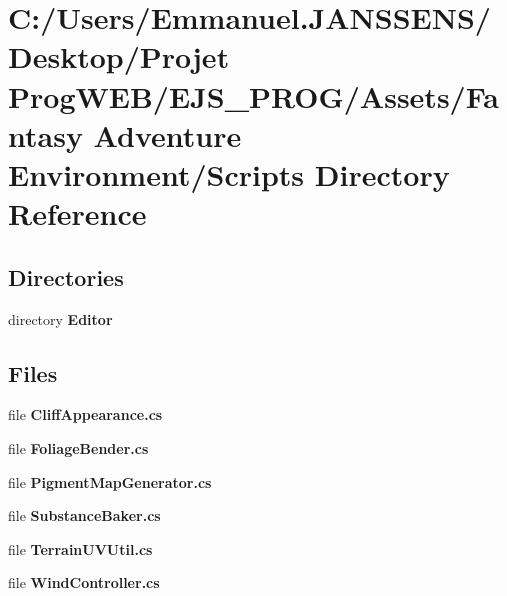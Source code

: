 \section{C\+:/\+Users/\+Emmanuel.J\+A\+N\+S\+S\+E\+N\+S/\+Desktop/\+Projet Prog\+W\+E\+B/\+E\+J\+S\+\_\+\+P\+R\+O\+G/\+Assets/\+Fantasy Adventure Environment/\+Scripts Directory Reference}
\label{dir_bd42beb639994f5a9e4081b24355153c}
\subsection*{Directories}
\begin{DoxyCompactItemize}
\item 
directory \textbf{ Editor}
\end{DoxyCompactItemize}
\subsection*{Files}
\begin{DoxyCompactItemize}
\item 
file \textbf{ Cliff\+Appearance.\+cs}
\item 
file \textbf{ Foliage\+Bender.\+cs}
\item 
file \textbf{ Pigment\+Map\+Generator.\+cs}
\item 
file \textbf{ Substance\+Baker.\+cs}
\item 
file \textbf{ Terrain\+U\+V\+Util.\+cs}
\item 
file \textbf{ Wind\+Controller.\+cs}
\end{DoxyCompactItemize}
